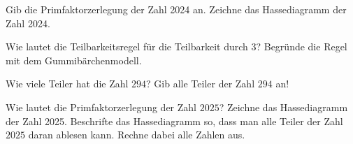 \documentclass{cssheet}
\begin{document}
\begin{aufgabe}[WiSe 23/24]
	Gib die Primfaktorzerlegung der Zahl 2024 an. Zeichne das Hassediagramm der Zahl 2024.
\end{aufgabe}

\begin{aufgabe}[SoSe 24]
	Wie lautet die Teilbarkeitsregel für die Teilbarkeit durch $3$? Begründe die Regel mit dem Gummibärchenmodell.
\end{aufgabe}

\begin{aufgabe}[SoSe 24]
	Wie viele Teiler hat die Zahl $294$? Gib alle Teiler der Zahl $294$ an!
\end{aufgabe}

\begin{aufgabe}[WiSe 24/25]
	Wie lautet die Primfaktorzerlegung der Zahl $2025$? Zeichne das Hassediagramm der Zahl 2025. Beschrifte das Hassediagramm so, dass man alle Teiler der Zahl $2025$ daran ablesen kann. Rechne dabei alle Zahlen aus.
\end{aufgabe}


\vspace*{10mm}
\printlicense

\printsocials
\end{document}
